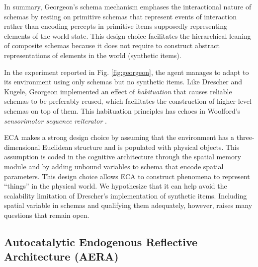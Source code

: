\documentclass[runningheads]{llncs}
\begin{document}
In summary, Georgeon's schema mechanism emphases the interactional nature of schemas by resting on primitive schemas that represent events of interaction rather than encoding percepts in primitive items supposedly representing elements of the world state. 
This design choice facilitates the hierarchical leaning of composite schemas because it does not require to construct abstract representations of elements in the world (synthetic items).

In the experiment reported in Fig. \ref{fig:georgeon}, the agent manages to adapt to its environment using only schemas but no synthetic items.
Like Drescher and Kugele, Georgeon implemented an effect of \textit{habituation} that causes reliable schemas to be preferably reused, which facilitates the construction of higher-level schemas on top of them. 
This habituation principles has echoes in Woolford's \textit{sensorimotor sequence reiterator} \cite{woolford_precarious_2020}.


ECA makes a strong design choice by assuming that the environment has a three-dimensional Euclidean structure and is populated with physical objects. 
This assumption is coded in the cognitive architecture through the spatial memory module and by adding unbound variables to schema that encode spatial parameters. 
This design choice allows ECA to construct phenomena to represent ``things'' in the physical world. 
We hypothesize that it can help avoid the scalability limitation of Drescher's implementation of synthetic items. 
Including spatial variable in schemas and qualifying them adequately, however, raises many questions that remain open. 



\subsection{Autocatalytic Endogenous Reflective Architecture (AERA)}
\end{document}
